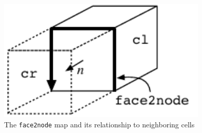 \documentclass{article}
\begin{document}
\begin{figure}[htbp]
\begin{center}
  \includegraphics[width=10cm]{face}
 \caption{The {\tt face2node} map and its relationship to neighboring cells}
 \label{fig:face}
\end{center}
\end{figure}
\end{document}
